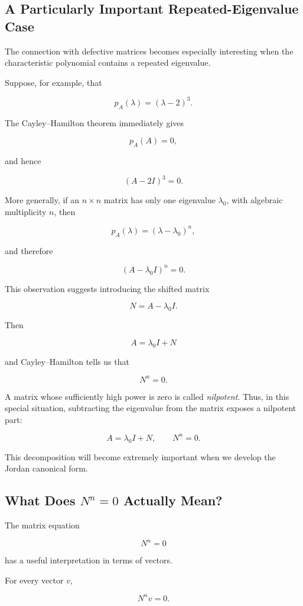 \documentclass[11pt]{article}
\begin{document}
\subsection{A Particularly Important Repeated-Eigenvalue Case}

The connection with defective matrices becomes especially interesting
when the characteristic polynomial contains a repeated eigenvalue.

Suppose, for example, that

\[
p_A(\lambda)=(\lambda-2)^3.
\]

The Cayley--Hamilton theorem immediately gives

\[
p_A(A)=0,
\]

and hence

\[
\boxed{
(A-2I)^3=0.
}
\]

More generally, if an \(n\times n\) matrix has only one eigenvalue
\(\lambda_0\), with algebraic multiplicity \(n\), then

\[
p_A(\lambda)
=
(\lambda-\lambda_0)^n,
\]

and therefore

\[
\boxed{
(A-\lambda_0 I)^n=0.
}
\]

This observation suggests introducing the shifted matrix

\[
N=A-\lambda_0 I.
\]

Then

\[
A=\lambda_0 I+N
\]

and Cayley--Hamilton tells us that

\[
N^n=0.
\]

A matrix whose sufficiently high power is zero is called
\emph{nilpotent}.  Thus, in this special situation, subtracting the
eigenvalue from the matrix exposes a nilpotent part:

\[
\boxed{
A=\lambda_0 I+N,
\qquad
N^n=0.
}
\]

This decomposition will become extremely important when we develop the
Jordan canonical form.

\subsection{What Does \(N^n=0\) Actually Mean?}

The matrix equation

\[
N^n=0
\]

has a useful interpretation in terms of vectors.

For every vector \(v\),

\[
N^n v=0.
\]
\end{document}
